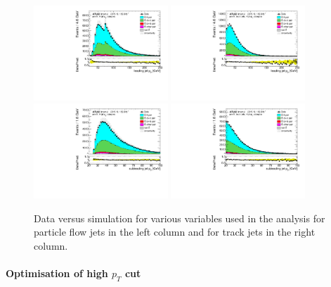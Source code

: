 \documentclass[letterpaper,12pt]{article}
\begin{document}
\begin{figure}%
		\centering
		\includegraphics[width=0.45\textwidth]{figs_support/plots_hm/DataMC_h_J0_pt_all_2.pdf}
		\includegraphics[width=0.45\textwidth]{figs_support/plots_hm/DataMC_h_tjet_J0_pt_all_2.pdf}\\
		\includegraphics[width=0.45\textwidth]{figs_support/plots_hm/DataMC_h_J1_pt_all_2.pdf}
		\includegraphics[width=0.45\textwidth]{figs_support/plots_hm/DataMC_h_tjet_J1_pt_all_2.pdf}\\
		\caption{Data versus simulation for various variables used in the analysis for 
		particle flow jets in the left column and for track jets in the right column.}
		\label{fig:kinematic_distributions_highpT}
\end{figure}
		

\paragraph{Optimisation of high $p_{T}$ cut}
\label{cutvalue}
\end{document}
